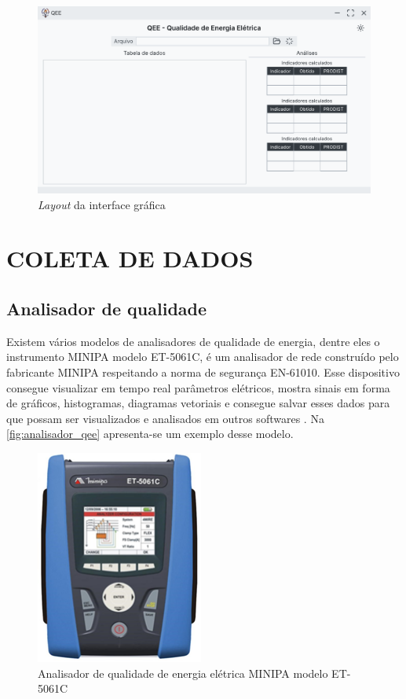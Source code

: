 \begin{figure}[H]
	\centering
	\caption{\textit{Layout} da interface gráfica}
	\label{fig:main_windown}
	\includegraphics[width=16cm]{illustrations/figures/main_windown.pdf}
\end{figure}

\section{COLETA DE DADOS}

\subsection{Analisador de qualidade}

Existem vários modelos de analisadores de qualidade de energia, dentre eles o instrumento MINIPA modelo ET-5061C, é um analisador de rede construído pelo fabricante MINIPA respeitando a norma de segurança EN-61010. Esse dispositivo consegue visualizar em tempo real parâmetros elétricos, mostra sinais em forma de gráficos, histogramas, diagramas vetoriais e consegue salvar esses dados para que possam ser visualizados e analisados em outros softwares \cite{ref:minipa_2019}. Na \autoref{fig:analisador_qee} apresenta-se um exemplo desse modelo.

\begin{figure}[H]
	\centering
	\caption{Analisador de qualidade de energia elétrica MINIPA modelo ET-5061C}
	\label{fig:analisador_qee}
	\includegraphics[width=5.5cm]{illustrations/figures/analisador_qee.png}
\end{figure}

